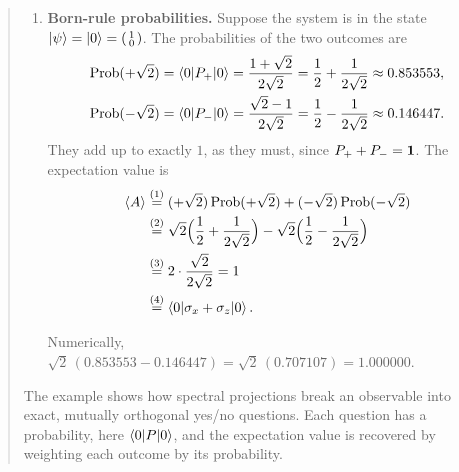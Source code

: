 \begin{quote}
\begin{enumerate}
\begin{itemize}
is $\tfrac18\big[(1+\sqrt2)(\sqrt2-1)-1\big]=\tfrac18(1-1)=0$.
\item $P_+^2 = P_+$ and $P_-^2 = P_-$. This follows from the two previous lines:
$P_+^2=P_+(\id-P_-)=P_+-P_+P_-=P_+$, and in the same way for $P_-$.
\item Spectral decomposition: $\lambda_+ P_+ + \lambda_- P_- = \sqrt2\, P_+ - \sqrt2\, P_-
= \begin{psmallmatrix} 1 & 1 \\ 1 & -1 \end{psmallmatrix} = A$.
\end{itemize}
\item \textbf{Born-rule probabilities.} Suppose the system is in the state
$\ket\psi = \ket0 = \begin{psmallmatrix} 1 \\ 0 \end{psmallmatrix}$. The probabilities of the two outcomes are
\begin{align}
\operatorname{Prob}(+\sqrt2) &= \braket{0|P_+|0} = \frac{1+\sqrt2}{2\sqrt2}
= \frac12 + \frac{1}{2\sqrt2} \approx 0.853553 , \notag\\
\operatorname{Prob}(-\sqrt2) &= \braket{0|P_-|0} = \frac{\sqrt2-1}{2\sqrt2}
= \frac12 - \frac{1}{2\sqrt2} \approx 0.146447 . \notag
\end{align}
They add up to exactly $1$, as they must, since $P_++P_-=\mathbf{1}$. The expectation value is
\begin{align}
\braket{A}
&\overset{(1)}{=} (+\sqrt2)\operatorname{Prob}(+\sqrt2) + (-\sqrt2)\operatorname{Prob}(-\sqrt2) \notag\\
&\overset{(2)}{=} \sqrt2\Big(\frac12 + \frac{1}{2\sqrt2}\Big) - \sqrt2\Big(\frac12 - \frac{1}{2\sqrt2}\Big) \notag\\
&\overset{(3)}{=} 2\cdot\frac{\sqrt2}{2\sqrt2} = 1 \notag\\
&\overset{(4)}{=} \braket{0|\sigma_x+\sigma_z|0} . \notag
\end{align}
\quad
{}\quad
{}\quad
{}

Numerically, $\sqrt2\,(0.853553-0.146447)=\sqrt2\,(0.707107)=1.000000$.
\end{enumerate}
The example shows how spectral projections break an observable into exact, mutually orthogonal yes/no
questions. Each question has a probability, here $\braket{0|P|0}$, and the expectation value is recovered by
weighting each outcome by its probability.
\end{quote}


